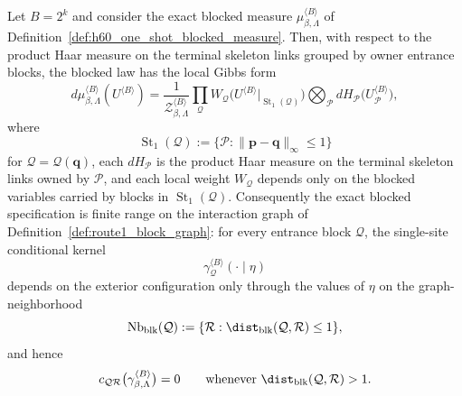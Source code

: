 \begin{proposition}
\label{prop:route1_block_finite_range}
Let $B=2^k$ and consider the exact blocked measure $\mu_{\beta,\Lambda}^{\langle B\rangle}$ of Definition~\ref{def:h60_one_shot_blocked_measure}.
Then, with respect to the product Haar measure on the terminal skeleton links grouped by owner entrance blocks, the blocked law has the local Gibbs form
\begin{equation}\label{eq:route1_block_local_gibbs}
 d\mu_{\beta,\Lambda}^{\langle B\rangle}(U^{\langle B\rangle})
 =
 \frac{1}{\mathcal Z_{\beta,\Lambda}^{\langle B\rangle}}
 \prod_{\mathcal Q} W_{\mathcal Q}\bigl(U^{\langle B\rangle}|_{\operatorname{St}_1(\mathcal Q)}\bigr)
 \bigotimes_{\mathcal P} dH_{\mathcal P}\bigl(U^{\langle B\rangle}_{\mathcal P}\bigr),
\end{equation}
where
\[
\operatorname{St}_1(\mathcal Q):=\{\mathcal P:\|\mathbf p-\mathbf q\|_\infty\le 1\}
\]
for $\mathcal Q=\mathcal Q(\mathbf q)$, each $dH_{\mathcal P}$ is the product Haar measure on the terminal skeleton links owned by $\mathcal P$, and each local weight $W_{\mathcal Q}$ depends only on the blocked variables carried by blocks in $\operatorname{St}_1(\mathcal Q)$.
Consequently the exact blocked specification is finite range on the interaction graph of Definition~\ref{def:route1_block_graph}: for every entrance block $\mathcal Q$, the single-site conditional kernel
\[
\gamma^{\langle B\rangle}_{\mathcal Q}(\cdot\mid\eta)
\]
depends on the exterior configuration only through the values of $\eta$ on the graph-neighborhood
\[
\operatorname{Nb}_{\mathrm{blk}}(\mathcal Q):=\{\mathcal R:\dist_{\mathrm{blk}}(\mathcal Q,\mathcal R)\le 1\},
\]
and hence
\begin{equation}\label{eq:route1_block_finite_range}
 c_{\mathcal Q\mathcal R}\bigl(\gamma^{\langle B\rangle}_{\beta,\Lambda}\bigr)=0
 \qquad\text{whenever }\dist_{\mathrm{blk}}(\mathcal Q,\mathcal R)>1.
\end{equation}
\end{proposition}

